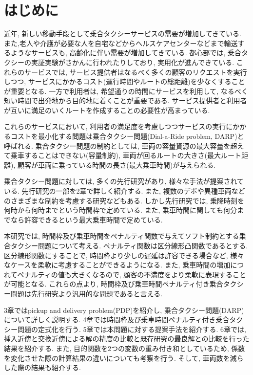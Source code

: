 \chapter{はじめに}
近年, 新しい移動手段として乗合タクシーサービスの需要が増加してきている. また,老人や介護が必要な人を自宅などからヘルスケアセンターなどまで輸送するようなサービスも, 高齢化に伴い需要が増加してきている.
都心部では, 乗合タクシーの実証実験がさかんに行われたりしており, 実用化が進んできている. これらのサービスでは, サービス提供者はなるべく多くの顧客のリクエストを実行しつつ, サービスにかかるコスト(運行時間やルートの総距離)を少なくすることが重要となる. 一方で利用者は, 希望通りの時間にサービスを利用して, なるべく短い時間で出発地から目的地に着くことが重要である. サービス提供者と利用者が互いに満足のいくルートを作成することの必要性が高まっている.

これらのサービスにおいて, 利用者の満足度を考慮しつつサービスの実行にかかるコストを最小化する問題は乗合タクシー問題(Dial-a-Ride problem, DARP)と呼ばれる.
乗合タクシー問題の制約としては, 車両の容量資源の最大容量を超えて乗車することはできない(容量制約), 車両が回るルートの大きさ(最大ルート距離), 顧客が車両に乗っている時間の長さ(最大乗車時間)が与えられる.

乗合タクシー問題に対しては, 多くの先行研究があり, 様々な手法が提案されている. 先行研究の一部を2章で詳しく紹介する. また, 複数のデポや異種車両などのさまざまな制約を考慮する研究などもある. しかし先行研究では, 乗降時刻を何時から何時までという時間枠で定めている. また, 乗車時間に関しても何分までなら許容できるという最大乗車時間で定めている.

本研究では, 時間枠及び乗車時間をペナルティ関数で与えてソフト制約とする乗合タクシー問題について考える. ペナルティ関数は区分線形凸関数であるとする. 区分線形関数にすることで, 時間枠より少しの遅延は許容できる場合など, 様々なケースを柔軟に考慮することができるようになる. また, 乗車時間の増加につれてペナルティの値も大きくなるので, 顧客の不満度をより柔軟に表現することが可能となる. これらの点より, 時間枠及び乗車時間ペナルティ付き乗合タクシー問題は先行研究より汎用的な問題であると言える.

3章ではpickup and delivery problem(PDP)を紹介し, 乗合タクシー問題(DARP)について詳しく説明する. 4章では時間枠及び乗車時間ペナルティ付き乗合タクシー問題の定式化を行う. 5章では本問題に対する提案手法を紹介する. 
6章では, 挿入近傍と交換近傍による解の精度の比較と既存研究の最良解との比較を行った結果を紹介する. また, 目的関数を2つの変数の重み付き和としているため, 係数を変化させた際の計算結果の違いについても考察を行う. そして, 車両数を減らした際の結果も紹介する.
